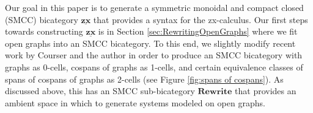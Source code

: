 \documentclass[./1--Catfying_zxCalc--Master.tex]{subfiles} %
\begin{document}
Our goal in this paper is
to generate a
symmetric monoidal and compact closed (SMCC) 
bicategory $\underline{\mathbf{zx}}$
that provides a syntax for the zx-calculus. 
Our first steps towards constructing 
$\underline{\mathbf{zx}}$
is in Section 
	\ref{sec:RewritingOpenGraphs} 
where we fit open graphs 
into an SMCC bicategory.
To this end, 
we slightly modify recent
work by Courser and the author
	\cite{Cicala_SpansCospans,
		CicalaCourser_BicatSpansCospan}
in order to produce an SMCC bicategory 
with graphs as 0-cells, 
cospans of graphs as 1-cells, 
and certain equivalence classes 
of spans of cospans of graphs as 2-cells
(see Figure \ref{fig:spans of cospans}). 
As discussed above, this has an
SMCC sub-bicategory $\mathbf{Rewrite}$
that provides an ambient space 
in which to generate systems 
modeled on open graphs.  
\end{document}
